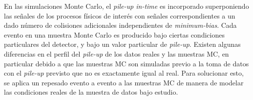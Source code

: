 En las simulaciones Monte Carlo, el \emph{pile-up in-time} es incorporado
superponiendo las señales de los procesos físicos de interés con señales
correspondientes a un dado número de colisiones adicionales independientes de
\emph{minimum-bias}.
Cada evento en una muestra Monte Carlo es producido bajo ciertas condiciones
particulares del detector, y bajo un valor particular de \emph{pile-up}. Existen
algunas diferencias en el perfil del \emph{pile-up} de los datos reales y las muestras
MC, en particular debido a que las muestras MC son simuladas previo a la toma de
datos con el \emph{pile-up} previsto que no es exactamente igual al real. Para
solucionar esto, se aplica un repesado evento a evento a las muestras MC de
manera de modelar las condiciones reales de la muestra de datos bajo estudio.
